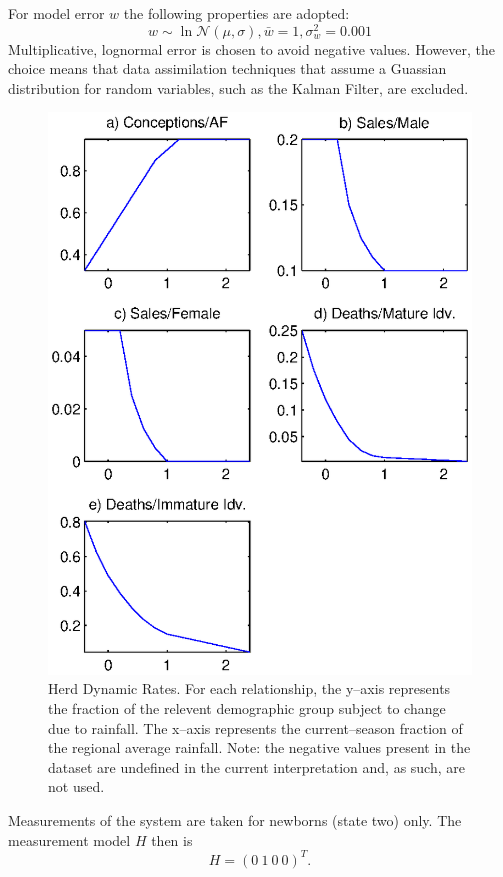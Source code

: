 \documentclass[fleqn, letterpaper]{amsart}
\begin{document}
For model error $w$ the following properties are adopted:
\[w\sim\ln\mathcal{N}(\mu,\sigma), \bar{w}=1, \sigma_w^2 = 0.001\]
Multiplicative, lognormal error is chosen to avoid negative values.
However, the choice means that data assimilation techniques that assume a Guassian distribution for random variables, such as the Kalman Filter, are excluded.
\begin{figure}
\includegraphics[width=1.0\textwidth]{refrel}
\caption{Herd Dynamic Rates. For each relationship, the y--axis represents the fraction of the relevent demographic group subject to change due to rainfall. The x--axis represents the current--season fraction of the regional average rainfall. Note: the negative values present in the dataset are undefined in the current interpretation and, as such, are not used.}
\label{rferels}
\end{figure}

Measurements of the system are taken for newborns (state two) only. The measurement model $H$ then is
\[H = (0\ 1\ 0\ 0)^T.\]
\end{document}
